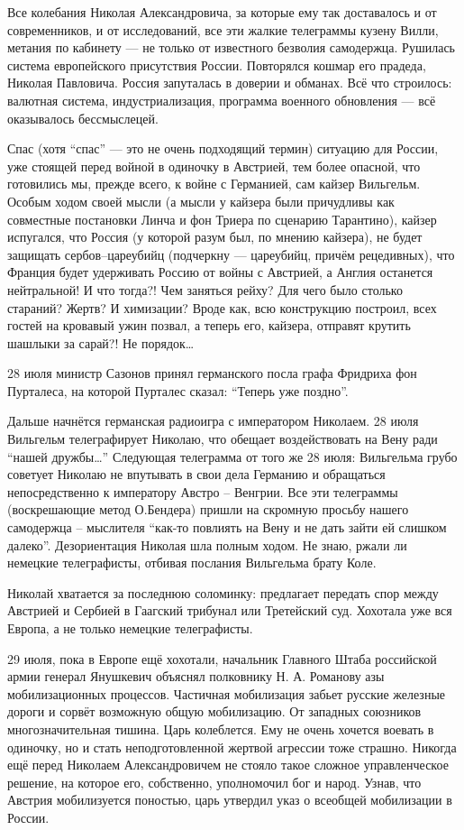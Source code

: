 Все колебания Николая Александровича, за которые ему так доставалось и от
современников, и от исследований, все эти жалкие телеграммы кузену Вилли,
метания по кабинету --- не только от известного безволия самодержца. Рушилась
система европейского присутствия России. Повторялся кошмар его прадеда, Николая
Павловича. Россия запуталась в доверии и обманах. Всё что строилось: валютная
система, индустриализация, программа военного обновления --- всё оказывалось
бессмыслецей.

Спас (хотя \enquote{спас} --- это  не очень подходящий термин) ситуацию для России,
уже стоящей перед войной в одиночку в Австрией, тем более опасной, что
готовились мы, прежде всего, к войне с Германией, сам кайзер Вильгельм. Особым
ходом своей мысли (а мысли у кайзера были причудливы как совместные постановки
Линча и фон Триера по сценарию Тарантино), кайзер испугался, что Россия (у
которой разум был, по мнению кайзера), не будет защищать сербов--цареубийц
(подчеркну --- цареубийц, причём рецедивных), что Франция будет удерживать
Россию от войны с Австрией, а Англия останется нейтральной! И что тогда?! Чем
заняться рейху? Для чего было столько стараний? Жертв? И химизации? Вроде как,
всю конструкцию построил, всех гостей на кровавый ужин позвал, а теперь его,
кайзера, отправят крутить шашлыки за сарай?! Не порядок\ldots

28 июля министр Сазонов принял германского посла графа Фридриха фон Пурталеса,
на которой Пурталес сказал: \enquote{Теперь уже поздно}.

Дальше начнётся германская радиоигра с императором Николаем. 28 июля Вильгельм
телеграфирует Николаю, что обещает воздействовать на Вену ради \enquote{нашей
дружбы\ldots} Следующая телеграмма от того же 28 июля:  Вильгельма грубо
советует Николаю не впутывать в свои дела Германию и обращаться непосредственно
к императору Австро -- Венгрии. Все эти телеграммы (воскрешающие метод О.Бендера)
пришли на скромную просьбу нашего самодержца -- мыслителя \enquote{как-то повлиять на
Вену и не дать зайти ей слишком далеко}. Дезориентация Николая шла полным
ходом. Не знаю, ржали ли немецкие телеграфисты, отбивая послания Вильгельма
брату Коле.

Николай хватается за последнюю соломинку: предлагает передать спор между
Австрией и Сербией в Гаагский трибунал или Третейский суд. Хохотала уже вся
Европа, а не только немецкие телеграфисты.

29 июля, пока в Европе ещё хохотали, начальник Главного Штаба российской армии
генерал Янушкевич объяснял полковнику Н. А. Романову азы мобилизационных
процессов. Частичная мобилизация забьет русские железные дороги и сорвёт
возможную общую мобилизацию. От западных союзников многозначительная тишина.
Царь колеблется. Ему не очень хочется воевать в одиночку, но и стать
неподготовленной жертвой агрессии тоже страшно. Никогда ещё перед Николаем
Александровичем не стояло такое сложное управленческое решение, на которое его,
собственно, уполномочил бог и народ. Узнав, что Австрия мобилизуется поностью,
царь утвердил указ о всеобщей мобилизации в России.

